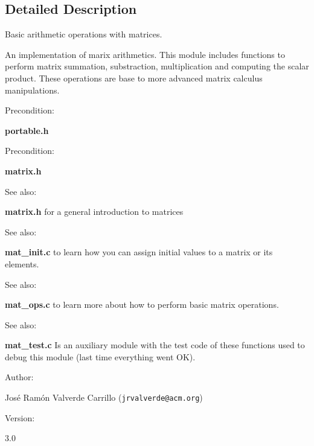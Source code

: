 \subsection{Detailed Description}
Basic arithmetic operations with matrices.



An implementation of marix arithmetics. This module includes functions to perform matrix summation, substraction, multiplication and computing the scalar product. These operations are base to more advanced matrix calculus manipulations.

\begin{Desc}
\item[Precondition: ]\par
{\bf portable.h}\end{Desc}
\begin{Desc}
\item[Precondition: ]\par
{\bf matrix.h}\end{Desc}
\begin{Desc}
\item[See also: ]\par
{\bf matrix.h} for a general introduction to matrices\end{Desc}
\begin{Desc}
\item[See also: ]\par
{\bf mat\_\-init.c} to learn how you can assign initial values to a matrix or its elements.\end{Desc}
\begin{Desc}
\item[See also: ]\par
{\bf mat\_\-ops.c} to learn more about how to perform basic matrix operations.\end{Desc}
\begin{Desc}
\item[See also: ]\par
{\bf mat\_\-test.c} Is an auxiliary module with the test code of these functions used to debug this module (last time everything went OK).\end{Desc}
\begin{Desc}
\item[Author: ]\par
Jos\'{e} Ram\'{o}n Valverde Carrillo ({\tt jrvalverde@acm.org})\end{Desc}
\begin{Desc}
\item[Version: ]\par
3.0\end{Desc}
